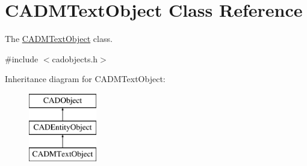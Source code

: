 \hypertarget{class_c_a_d_m_text_object}{}\section{C\+A\+D\+M\+Text\+Object Class Reference}
\label{class_c_a_d_m_text_object}


The \hyperlink{class_c_a_d_m_text_object}{C\+A\+D\+M\+Text\+Object} class.  




{\ttfamily \#include $<$cadobjects.\+h$>$}

Inheritance diagram for C\+A\+D\+M\+Text\+Object\+:\begin{figure}[H]
\begin{center}
\leavevmode
\includegraphics[height=3.000000cm]{class_c_a_d_m_text_object}
\end{center}
\end{figure}
